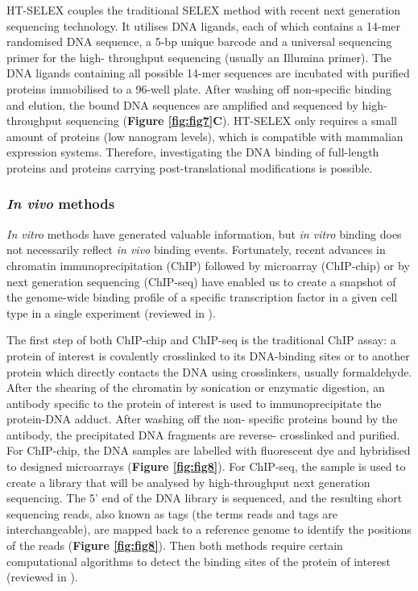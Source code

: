 HT-SELEX couples the traditional SELEX method with recent next generation sequencing technology. It utilises DNA ligands, each of which contains a 14-mer randomised DNA sequence, a 5-bp unique barcode and a universal sequencing primer for the high- throughput sequencing (usually an Illumina primer). The DNA ligands containing all possible 14-mer sequences are incubated with purified proteins immobilised to a 96-well plate. After washing off non-specific binding and elution, the bound DNA sequences are amplified and sequenced by high-throughput sequencing (\textbf{Figure \ref{fig:fig7}C}). HT-SELEX only requires a small amount of proteins (low nanogram levels), which is compatible with mammalian expression systems. Therefore, investigating the DNA binding of full-length proteins and proteins carrying post-translational modifications is possible.

\subsubsection{\textit{In vivo} methods}

\textit{In vitro} methods have generated valuable information, but \textit{in vitro} binding does not necessarily reflect \textit{in vivo} binding events. Fortunately, recent advances in chromatin immunoprecipitation (ChIP) followed by microarray (ChIP-chip) or by next generation sequencing (ChIP-seq) have enabled us to create a snapshot of the genome-wide binding profile of a specific transcription factor in a given cell type in a single experiment (reviewed in \cite{farnham2009insights}).

The first step of both ChIP-chip and ChIP-seq is the traditional ChIP assay: a protein of interest is covalently crosslinked to its DNA-binding sites or to another protein which directly contacts the DNA using crosslinkers, usually formaldehyde. After the shearing of the chromatin by sonication or enzymatic digestion, an antibody specific to the protein of interest is used to immunoprecipitate the protein-DNA adduct. After washing off the non- specific proteins bound by the antibody, the precipitated DNA fragments are reverse- crosslinked and purified. For ChIP-chip, the DNA samples are labelled with fluorescent dye and hybridised to designed microarrays (\textbf{Figure \ref{fig:fig8}}). For ChIP-seq, the sample is used to create a library that will be analysed by high-throughput next generation sequencing. The 5’ end of the DNA library is sequenced, and the resulting short sequencing reads, also known as tags (the terms reads and tags are interchangeable), are mapped back to a reference genome to identify the positions of the reads (\textbf{Figure \ref{fig:fig8}}). Then both methods require certain computational algorithms to detect the binding sites of the protein of interest (reviewed in \cite{park2009chip-seq:}).

